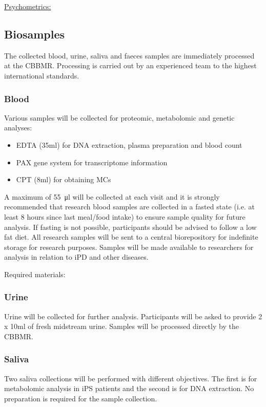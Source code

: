 \underline{Psychometrics:}

\subsection{Biosamples}
\label{subsec:biosamples}
The collected blood, urine, saliva and faeces samples are immediately processed at the \ac{CBBMR}. Processing is carried out by an experienced team to the highest international standards. 

\subsubsection{Blood}
\label{biosamples:blood}
Various samples will be collected for proteomic, metabolomic and genetic analyses:
\begin{itemize}
\item EDTA (35ml) for DNA extraction, plasma preparation and blood count
\item PAX gene system for transcriptome information
\item CPT (8ml) for obtaining MCs
\end{itemize}
A maximum of \SI[round-precision = 0, round-mode = places]{55}{\micro\litre} will be collected at each visit and it is strongly recommended that research blood samples are collected in a fasted state (i.e. at least 8 hours since last meal/food intake) to ensure sample quality for future analysis. If fasting is not possible, participants should be advised to follow a low fat diet. All research samples will be sent to a central biorepository for indefinite storage for research purposes. Samples will be made available to researchers for analysis in relation to \ac{iPD} and other diseases.

Required materials:

\subsubsection{Urine}
\label{biosamples:urine}
Urine will be collected for further analysis. Participants will be asked to provide 2 x 10ml of fresh midstream urine. Samples will be processed directly by the \ac{CBBMR}.

\subsubsection{Saliva}
\label{biosamples:saliva}
Two saliva collections will be performed with different objectives. The first is for metabolomic analysis in \ac{iPS} patients and the second is for DNA extraction. No preparation is required for the sample collection.


